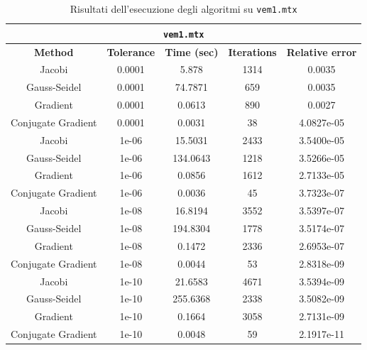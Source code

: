\documentclass[12pt]{article}
\begin{document}
\begin{table}[!ht]
    \centering
    \begin{tabular}{ccccc}
    \toprule
    \multicolumn{5}{c}{\texttt{vem1.mtx}}\\
    \midrule
        \textbf{Method} & \textbf{Tolerance} & \textbf{Time (sec)} & \textbf{Iterations} & \textbf{Relative error} \\ \midrule
        Jacobi & 0.0001 & 5.878 & 1314 & 0.0035 \\ 
        Gauss-Seidel & 0.0001 & 74.7871 & 659 & 0.0035 \\ 
        Gradient & 0.0001 & 0.0613 & 890 & 0.0027 \\ 
        Conjugate Gradient & 0.0001 & 0.0031 & 38 & 4.0827e-05 \\ \midrule
        Jacobi & 1e-06 & 15.5031 & 2433 & 3.5400e-05 \\ 
        Gauss-Seidel & 1e-06 & 134.0643 & 1218 & 3.5266e-05 \\ 
        Gradient & 1e-06 & 0.0856 & 1612 & 2.7133e-05 \\ 
        Conjugate Gradient & 1e-06 & 0.0036 & 45 & 3.7323e-07 \\ \midrule
        Jacobi & 1e-08 & 16.8194 & 3552 & 3.5397e-07 \\ 
        Gauss-Seidel & 1e-08 & 194.8304 & 1778 & 3.5174e-07 \\ 
        Gradient & 1e-08 & 0.1472 & 2336 & 2.6953e-07 \\ 
        Conjugate Gradient & 1e-08 & 0.0044 & 53 & 2.8318e-09 \\ \midrule
        Jacobi & 1e-10 & 21.6583 & 4671 & 3.5394e-09 \\ 
        Gauss-Seidel & 1e-10 & 255.6368 & 2338 & 3.5082e-09 \\ 
        Gradient & 1e-10 & 0.1664 & 3058 & 2.7131e-09 \\ 
        Conjugate Gradient & 1e-10 & 0.0048 & 59 & 2.1917e-11 \\   \bottomrule
    \end{tabular}
    \caption{Risultati dell'esecuzione degli algoritmi su \texttt{vem1.mtx}}
    \label{table:vem1-stats}
\end{table}
\end{document}
